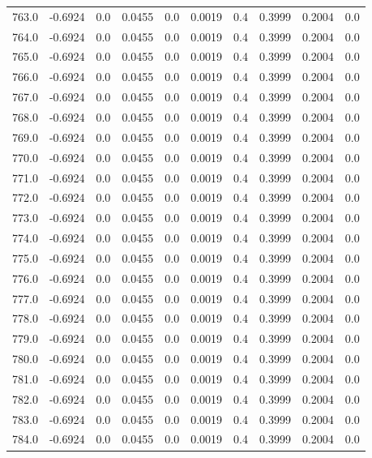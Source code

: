 \begin{longtable}{lrrrrrrrrr}
763.0 & -0.6924 & 0.0 & 0.0455 & 0.0 & 0.0019 & 0.4 & 0.3999 & 0.2004 & 0.0 \\
764.0 & -0.6924 & 0.0 & 0.0455 & 0.0 & 0.0019 & 0.4 & 0.3999 & 0.2004 & 0.0 \\
765.0 & -0.6924 & 0.0 & 0.0455 & 0.0 & 0.0019 & 0.4 & 0.3999 & 0.2004 & 0.0 \\
766.0 & -0.6924 & 0.0 & 0.0455 & 0.0 & 0.0019 & 0.4 & 0.3999 & 0.2004 & 0.0 \\
767.0 & -0.6924 & 0.0 & 0.0455 & 0.0 & 0.0019 & 0.4 & 0.3999 & 0.2004 & 0.0 \\
768.0 & -0.6924 & 0.0 & 0.0455 & 0.0 & 0.0019 & 0.4 & 0.3999 & 0.2004 & 0.0 \\
769.0 & -0.6924 & 0.0 & 0.0455 & 0.0 & 0.0019 & 0.4 & 0.3999 & 0.2004 & 0.0 \\
770.0 & -0.6924 & 0.0 & 0.0455 & 0.0 & 0.0019 & 0.4 & 0.3999 & 0.2004 & 0.0 \\
771.0 & -0.6924 & 0.0 & 0.0455 & 0.0 & 0.0019 & 0.4 & 0.3999 & 0.2004 & 0.0 \\
772.0 & -0.6924 & 0.0 & 0.0455 & 0.0 & 0.0019 & 0.4 & 0.3999 & 0.2004 & 0.0 \\
773.0 & -0.6924 & 0.0 & 0.0455 & 0.0 & 0.0019 & 0.4 & 0.3999 & 0.2004 & 0.0 \\
774.0 & -0.6924 & 0.0 & 0.0455 & 0.0 & 0.0019 & 0.4 & 0.3999 & 0.2004 & 0.0 \\
775.0 & -0.6924 & 0.0 & 0.0455 & 0.0 & 0.0019 & 0.4 & 0.3999 & 0.2004 & 0.0 \\
776.0 & -0.6924 & 0.0 & 0.0455 & 0.0 & 0.0019 & 0.4 & 0.3999 & 0.2004 & 0.0 \\
777.0 & -0.6924 & 0.0 & 0.0455 & 0.0 & 0.0019 & 0.4 & 0.3999 & 0.2004 & 0.0 \\
778.0 & -0.6924 & 0.0 & 0.0455 & 0.0 & 0.0019 & 0.4 & 0.3999 & 0.2004 & 0.0 \\
779.0 & -0.6924 & 0.0 & 0.0455 & 0.0 & 0.0019 & 0.4 & 0.3999 & 0.2004 & 0.0 \\
780.0 & -0.6924 & 0.0 & 0.0455 & 0.0 & 0.0019 & 0.4 & 0.3999 & 0.2004 & 0.0 \\
781.0 & -0.6924 & 0.0 & 0.0455 & 0.0 & 0.0019 & 0.4 & 0.3999 & 0.2004 & 0.0 \\
782.0 & -0.6924 & 0.0 & 0.0455 & 0.0 & 0.0019 & 0.4 & 0.3999 & 0.2004 & 0.0 \\
783.0 & -0.6924 & 0.0 & 0.0455 & 0.0 & 0.0019 & 0.4 & 0.3999 & 0.2004 & 0.0 \\
784.0 & -0.6924 & 0.0 & 0.0455 & 0.0 & 0.0019 & 0.4 & 0.3999 & 0.2004 & 0.0 \\

\end{longtable}
